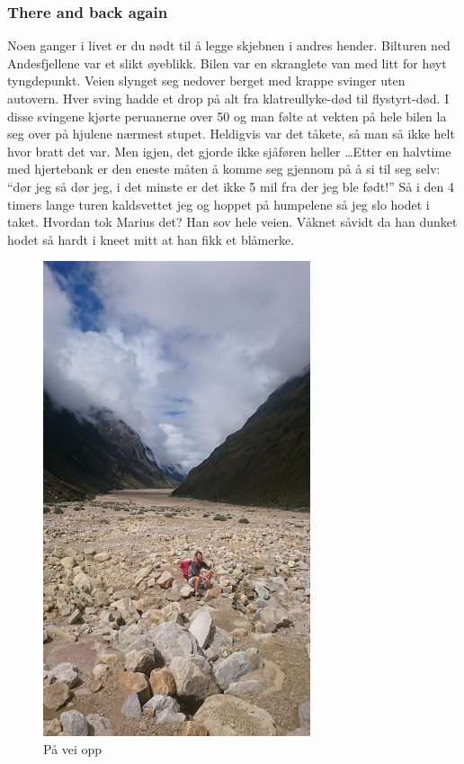 \subsubsection{There and back again}
Noen ganger i livet er du nødt til å legge skjebnen i andres hender.
Bilturen ned Andesfjellene var et slikt øyeblikk. Bilen var en
skranglete van med litt for høyt tyngdepunkt. Veien slynget seg
nedover berget med krappe svinger uten autovern. Hver sving hadde et
drop på alt fra klatreullyke-død til flystyrt-død. I disse svingene
kjørte peruanerne over 50 og man følte at vekten på hele
bilen la seg over på hjulene nærmest stupet. Heldigvis var det tåkete,
så man så ikke helt hvor bratt det var. Men igjen, det gjorde ikke
sjåføren heller \ldots Etter en halvtime med hjertebank er den eneste
måten å komme seg gjennom på å si til seg selv: ``dør jeg så dør jeg,
i det minste er det ikke 5 mil fra der jeg ble født!'' Så i den 4
timers lange turen kaldsvettet jeg og hoppet på humpelene så jeg slo
hodet i taket. Hvordan tok Marius det? Han sov hele veien. Våknet
såvidt da han dunket hodet så hardt i kneet mitt at han fikk et
blåmerke. 

\begin{figure}[!h]
	\centering
	\includegraphics[width=0.7\textwidth]{akselidalen}
	\caption*{På vei opp}
\label{fig:akselidalen}
\end{figure}

